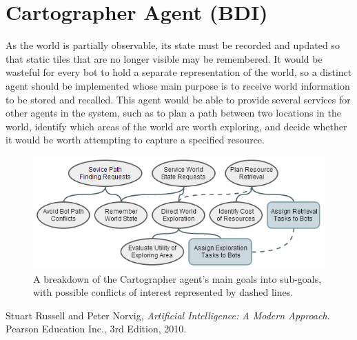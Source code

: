 \documentclass[a4paper,10pt]{article}
\begin{document}
\section{Cartographer Agent (BDI)}
As the world is partially observable, its state must be recorded and updated so that static tiles that are no longer visible may be remembered. It would be wasteful for every bot to hold a separate representation of the world, so a distinct agent should be implemented whose main purpose is to receive world information to be stored and recalled. This agent would be able to provide several services for other agents in the system, such as to plan a path between two locations in the world, identify which areas of the world are worth exploring, and decide whether it would be worth attempting to capture a specified resource.

\begin{figure}[ht]
  \centering
  \includegraphics[width=0.7\linewidth]{cartographer}
  \begin{minipage}[t]{0.8\textwidth}
    \caption{A breakdown of the Cartographer agent's main goals into sub-goals, with possible conflicts of interest represented by dashed lines.}
  \end{minipage}
\end{figure}

\begin{thebibliography}{9}
    Stuart Russell and Peter Norvig,
    \emph{Artificial Intelligence: A Modern Approach}. \newline
    Pearson Education Inc.,
    3rd Edition,
    2010.
\end{thebibliography}
\end{document}

